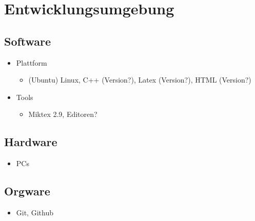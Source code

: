 
\section{Entwicklungsumgebung}


\subsection{Software}

\begin{itemize}
  \item Plattform
    \begin{itemize}
		\item (Ubuntu) Linux, C++ (Version?), Latex (Version?), HTML (Version?)
    \end{itemize}
  \item Tools
    \begin{itemize}
  		\item Miktex 2.9, Editoren?
    \end{itemize}

\end{itemize}

\subsection{Hardware}

\begin{itemize}
	\item PCs
\end{itemize}

\subsection{Orgware}

\begin{itemize}
  	\item Git, Github
\end{itemize}
